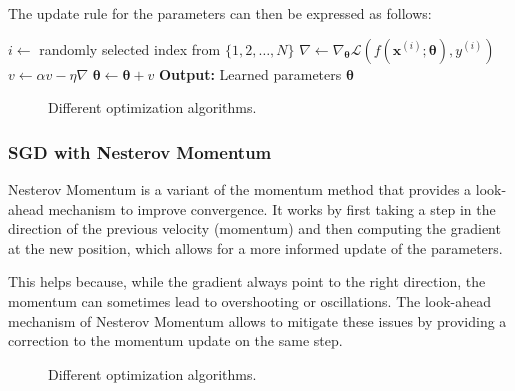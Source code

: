 The update rule for the parameters can then be expressed as follows:
\begin{algorithm}[H]
    \caption{Stochastic Gradient Descent with Momentum}
    \begin{algorithmic}[1]
            \State $i \leftarrow$ randomly selected index from $\{1, 2, \ldots, N\}$
            \State $\nabla \leftarrow \nabla_{\boldsymbol{\theta}} \mathcal{L}(f(\boldsymbol{x}^{(i)}; \boldsymbol{\theta}), y^{(i)})$
            \State $v \leftarrow \alpha v - \eta \nabla$
            \State $\boldsymbol{\theta} \leftarrow \boldsymbol{\theta} + v$
        \EndWhile
        \State \textbf{Output:} Learned parameters $\boldsymbol{\theta}$
    \end{algorithmic}
\end{algorithm}

\begin{figure}[H]
    \centering
    \scalebox{0.3}{}
    \caption{Different optimization algorithms.}
\end{figure}

\subsubsection*{SGD with Nesterov Momentum}
Nesterov Momentum is a variant of the momentum method that provides a look-ahead mechanism to improve convergence.
It works by first taking a step in the direction of the previous velocity (momentum) and 
then computing the gradient at the new position, which allows for a more informed update of the parameters.

This helps because, while the gradient always point to the right direction, the momentum can sometimes lead to 
overshooting or oscillations. The look-ahead mechanism of Nesterov Momentum allows to mitigate these issues by providing a correction
to the momentum update on the same step.
\begin{figure}[H]
    \centering
    \scalebox{0.7}{}
    \caption{Different optimization algorithms.}
\end{figure}

